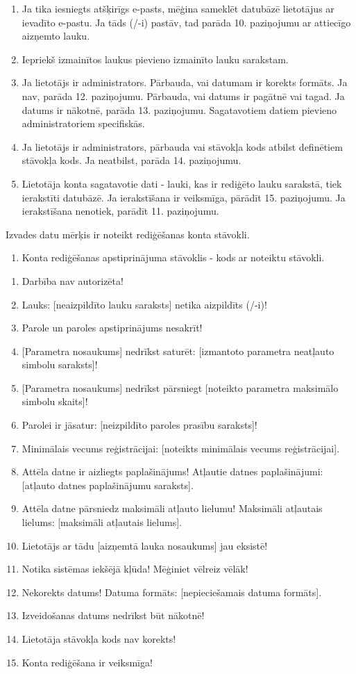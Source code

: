 {\begin{enumerate}
		      Ja tāds (/-i) pastāv, tad parāda 10. paziņojumu ar attiecīgo aizņemto lauku.
		\item Ja tika iesniegts atšķirīgs e-pasts, mēģina sameklēt datubāzē lietotājus ar ievadīto e-pastu.
		      Ja tāds (/-i) pastāv, tad parāda 10. paziņojumu ar attiecīgo aizņemto lauku.
		\item Iepriekš izmainītos laukus pievieno izmainīto lauku sarakstam.
		\item Ja lietotājs ir administrators.
		      Pārbauda, vai datumam ir korekts formāts.
		      Ja nav, parāda 12. paziņojumu.
		      Pārbauda, vai datums ir pagātnē vai tagad.
		      Ja datums ir nākotnē, parāda 13. paziņojumu.
		      Sagatavotiem datiem pievieno administratoriem specifiskās.
		\item Ja lietotājs ir administrators, pārbauda vai stāvokļa kods atbilst definētiem stāvokļa kods.
		      Ja neatbilst, parāda 14. paziņojumu.
		\item Lietotāja konta sagatavotie dati - lauki, kas ir rediģēto lauku sarakstā, tiek ierakstīti datubāzē.
		      Ja ierakstīšana ir veiksmīga, pārādīt 15. paziņojumu.
		      Ja ierakstīšana nenotiek, parādīt 11. paziņojumu.
	\end{enumerate}
}
{
	Izvades datu mērķis ir noteikt rediģēšanas konta stāvokli.
	\begin{enumerate}
		\item Konta rediģēšanas apstiprinājuma stāvoklis - kods ar noteiktu stāvokli.
	\end{enumerate}
}
{
	\begin{enumerate}
		\item Darbība nav autorizēta!
		\item Lauks: [neaizpildīto lauku saraksts] netika aizpildīts (/-i)!
		\item Parole un paroles apstiprinājums nesakrīt!
		\item {}[Parametra nosaukums] nedrīkst saturēt: [izmantoto parametra neatļauto simbolu saraksts]!
		\item {}[Parametra nosaukums] nedrīkst pārsniegt [noteikto parametra maksimālo simbolu skaits]!
		\item Parolei ir jāsatur: [neizpildīto paroles prasību saraksts]!
		\item Minimālais vecums reģistrācijai: [noteikts minimālais vecums reģistrācijai].
		\item Attēla datne ir aizliegts paplašinājums! Atļautie datnes paplašinājumi: [atļauto datnes paplašinājumu saraksts].
		\item Attēla datne pārsniedz maksimāli atļauto lielumu! Maksimāli atļautais lielums: [maksimāli atļautais lielums].
		\item Lietotājs ar tādu [aizņemtā lauka nosaukums] jau eksistē!
		\item Notika sistēmas iekšējā kļūda! Mēģiniet vēlreiz vēlāk!
		\item Nekorekts datums! Datuma formāts: [nepieciešamais datuma formāts].
		\item Izveidošanas datums nedrīkst būt nākotnē!
		\item Lietotāja stāvokļa kods nav korekts!
		\item Konta rediģēšana ir veiksmīga!
	\end{enumerate}
}

